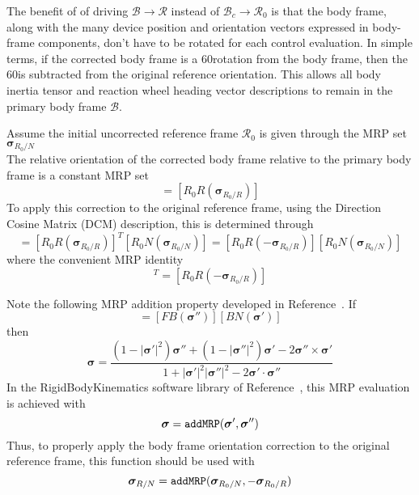 \documentclass[]{AVSSimReportMemo}
\begin{document}
The benefit of of driving $\mathcal{B} \rightarrow \mathcal{R}$ instead of $\mathcal{B}_{c} \rightarrow \mathcal{R}_{0}$ is that the body frame, along with the many device position and orientation vectors expressed in  body-frame components, don't have to be rotated for each control evaluation.  In simple terms, if the corrected body frame is a 60\dg rotation from the body frame, then the 60\dg is subtracted from the original reference orientation.  This allows all body inertia tensor and reaction wheel heading vector descriptions to remain in the primary body frame $\mathcal{B}$.  

Assume the initial uncorrected reference frame $\mathcal{R_{0}}$ is given through the MRP set $\bm\sigma_{R_{0}/N}$
\begin{equation}
	[R_{0}N(	\bm\sigma_{R_{0}/N})]
\end{equation}
The relative orientation of the corrected body frame relative to the primary body frame is a constant MRP set
\begin{equation}
	[B_{c}B(\bm\sigma_{B_{c}/B})] = [R_{0}R(\bm\sigma_{R_{0}/R})]
\end{equation}
To apply this correction to the original reference frame, using the Direction Cosine Matrix (DCM) description, this is determined through
\begin{equation}
	[RN(\bm\sigma_{R/N})] = [R_{0}R(\bm\sigma_{R_{0}/R})]^{T} [R_{0}N(\bm\sigma_{R_{0}/N})] = 
	[R_{0}R(-\bm\sigma_{R_{0}/R})] [R_{0}N(\bm\sigma_{R_{0}/N})]
\end{equation}
where the convenient MRP identity
\begin{equation}
	 [R_{0}R(\bm\sigma_{R_{0}/R})]^{T} = [R_{0}R(-\bm\sigma_{R_{0}/R})] 
\end{equation}

Note the following MRP addition property developed in Reference~.  If
\begin{equation}
	[BN(\bm\sigma)] = [FB(\bm\sigma '')] [ BN(\bm\sigma ')]
\end{equation}
then
\begin{equation}
	\bm\sigma = \frac{
		(1-|\bm\sigma'|^{2})\bm\sigma '' + (1-|\bm\sigma ''|^{2}) \bm\sigma ' - 2 \bm\sigma '' \times \bm\sigma '
	}{
		1 + |\bm\sigma '|^{2} |\bm\sigma''|^{2} - 2 \bm\sigma' \cdot \bm\sigma''
	}
\end{equation}
In the RigidBodyKinematics software library of Reference~, this MRP evaluation is achieved with 
$$
	\bm\sigma = {\tt addMRP}(\bm\sigma ', \bm\sigma'')
$$
Thus, to properly apply the body frame orientation correction to the original reference frame, this function should be used with
$$
	\bm\sigma_{R/N} = {\tt addMRP}(\bm\sigma_{R_{0}/N}, -\bm\sigma_{R_{0}/R})
$$
\end{document}
